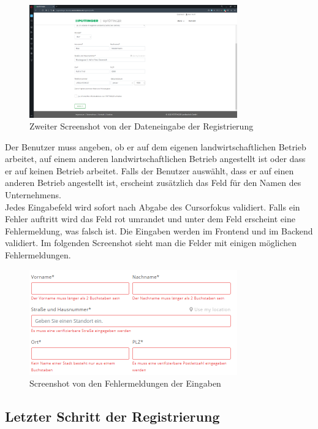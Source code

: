 \begin{figure}[H]
	\centerline{
		\includegraphics[width=0.8\textwidth]{./grafiken/erm_register_3.png}
	}
	\vskip0pt
	\caption{Zweiter Screenshot von der Dateneingabe der Registrierung} \label{fig:register3}
\end{figure}

Der Benutzer muss angeben, ob er auf dem eigenen landwirtschaftlichen Betrieb arbeitet, auf einem anderen landwirtschaftlichen Betrieb angestellt ist oder dass er auf keinen Betrieb arbeitet. Falls der Benutzer auswählt, dass er auf einen anderen Betrieb angestellt ist, erscheint zusätzlich das Feld für den Namen des Unternehmens.\\

Jedes Eingabefeld wird sofort nach Abgabe des Cursorfokus validiert. Falls ein Fehler auftritt wird das Feld rot umrandet und unter dem Feld erscheint eine Fehlermeldung, was falsch ist. Die Eingaben werden im Frontend und im Backend validiert. Im folgenden Screenshot sieht man die Felder mit einigen möglichen Fehlermeldungen.

\begin{figure}[H]
	\centerline{
		\includegraphics[width=0.8\textwidth]{./grafiken/dateneingabe_Errors.PNG}
	}
	\vskip0pt
	\caption{Screenshot von den Fehlermeldungen der Eingaben} \label{fig:eingabeError}
\end{figure}

\subsection{Letzter Schritt der Registrierung}


